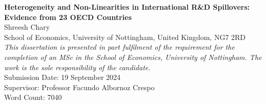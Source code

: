 \documentclass[12pt]{article}
\begin{document}
\begin{titlepage}
    \begin{center}
        \doublespacing 
        \vspace*{1in} 
        {\Large \bfseries Heterogeneity and Non-Linearities in International R\&D Spillovers: Evidence from 23 OECD Countries}\\[1.5cm]
        {\Large Shreesh Chary}\\[0.5cm]
        {\large School of Economics, University of Nottingham, United Kingdom, NG7 2RD} \\[2cm]
        \textit{This dissertation is presented in part fulfilment of the requirement for the completion of an MSc in the School of Economics, University of Nottingham.  The work is the sole responsibility of the candidate.}\\[2cm]
        Submission Date: 19 September 2024\\[0.5cm]
        Supervisor: Professor Facundo Albornoz Crespo\\[0.5cm]
        Word Count: 7040 \\[2cm]
    \end{center}
\end{titlepage}

\newpage
\setcounter{page}{2}
\begin{abstract}
This study explores the influence of international knowledge spillovers on productivity across 23 OECD countries over 49 years, focusing on the role of economic size, human capital, and import intensity. Using a dynamic Common Correlated Effects (CCE) estimator, it addresses cross-sectional dependency and unobserved common shocks that may bias traditional estimates. The findings challenge previous studies by showing statistically insignificant long-run effects of both domestic and foreign R\&D stocks. The results reveal that G7 countries and countries with higher levels of human capital gain more from domestic R\&D, while the benefits of foreign R\&D diminish as import intensity increases. Additionally, non-linear relationships between foreign R\&D and productivity are observed in countries with lower import share of GDP.  \\
\textit{\textbf{Keywords:} Dynamic CCE, Economic Growth, Productivity, R\&D, Spillovers}\\
\textit{\textbf{JEL Classification}: O31, O33, O40}
\end{abstract}

\newpage
\tableofcontents
\end{document}
